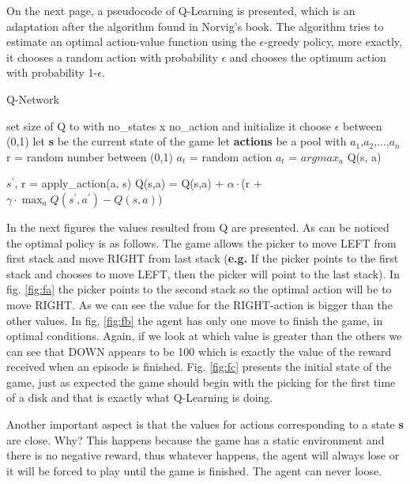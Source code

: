 On the next page, a pseudocode of Q-Learning is presented, which is an adaptation after the algorithm found in Norvig's book{\cite{norvig}}. The algorithm tries to estimate an optimal action-value function using the $\epsilon$-greedy policy, more exactly, it chooses a random action with probability $\epsilon$ and chooses the optimum action with probability 1-$\epsilon$.
\newpage
\begin{algorithm}
	\caption{Q-Network} \label{alg-code}
	\begin{algorithmic}[1]
		\State set size of Q to with no_states x no_action and initialize it
		\State choose $\epsilon$ between (0,1)
		\State let \textbf{s} be the current state of the game
		\State let \textbf{actions} be a pool with {$a_1$,$a_2$,...,$a_n$}
			\State r = random number between (0,1)
				\State $a_t$ = random action
			\Else
				\State $a_t$ = $argmax_a$ Q(s, a)
			\EndIf
			
			\State $s^\prime$, r = apply_action(a, s)
			\State Q(s,a) = Q(s,a) + $\alpha\cdot$(r + $\gamma\cdot \max_a Q(s^\prime,a^\prime)-Q(s,a)$)
		\EndWhile
	\end{algorithmic}
\end{algorithm}

In the next figures the values resulted from Q are presented. As can be noticed the optimal policy is as follows. The game allows the picker to move LEFT from first stack and move RIGHT from last stack (\textbf{e.g.} If the picker points to the first stack and chooses to move LEFT, then the picker will point to the last stack). In fig. \ref{fig:fa} the picker points to the second stack so the optimal action will be to move RIGHT. As we can see the value for the RIGHT-action is bigger than the other values. In fig. \ref{fig:fb} the agent has only one move to finish the game, in optimal conditions. Again, if we look at which value is greater than the others we can see that DOWN appears to be 100 which is exactly the value of the reward received when an episode is finished. Fig. \ref{fig:fc} presents the initial state of the game, just as expected the game should begin with the picking for the first time of a disk and that is exactly what Q-Learning is doing.

Another important aspect is that the values for actions corresponding to a state \textbf{s} are close. Why? This happens because the game has a static environment and there is no negative reward, thus whatever happens, the agent will always lose or it will be forced to play until the game is finished. The agent can never loose.

